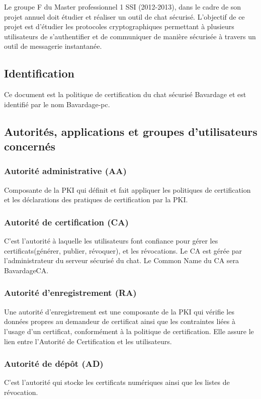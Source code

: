 \documentclass[a4paper,11pt,french]{book}
\begin{document}
Le groupe F du Master professionnel 1 SSI (2012-2013), dans le cadre de son projet annuel doit étudier et réaliser un outil de chat sécurisé. L'objectif de ce projet est d'étudier les protocoles cryptographiques permettant à plusieurs utilisateurs de s'authentifier et de communiquer de manière sécurisée à travers un outil de messagerie instantanée.


\subsection{ Identification }

Ce document est la politique de certification du chat sécurisé Bavardage et est identifié par le nom Bavardage-pc.


\subsection{ Autorités, applications et groupes d'utilisateurs concernés }
\subsubsection{Autorité administrative (AA)}

Composante de la PKI qui définit et fait appliquer les politiques de certification et les déclarations des pratiques de certification par la PKI.
	
\subsubsection{Autorité de certification (CA)}
C'est l'autorité à laquelle les utilisateurs font confiance pour gérer les certificats(générer, publier, révoquer), et les révocations. Le CA est gérée par l'administrateur du serveur sécurisé du chat. Le Common Name du CA sera BavardageCA.


\subsubsection{Autorité d'enregistrement (RA)}

Une autorité d’enregistrement est une composante de la PKI qui vérifie les données propres au demandeur de certificat ainsi que les contraintes liées à l’usage d’un certificat, conformément à la politique de certification. Elle assure le lien entre l'Autorité de Certification et les utilisateurs. 

\subsubsection{Autorité de dépôt (AD)}
C'est l'autorité qui stocke les certificats numériques ainsi que les listes de révocation.
\end{document}
